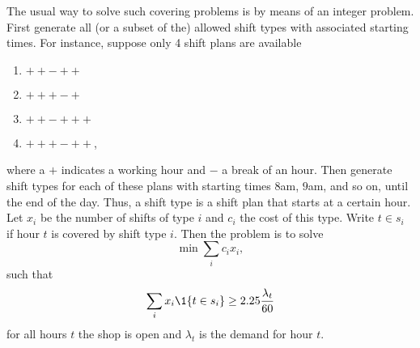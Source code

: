 The usual way to solve such covering problems is by means of an integer
problem. First generate all (or a subset of the) allowed shift types
with associated starting times. For instance, suppose only 4 shift
plans are available
\begin{enumerate}
\item $++-++$
\item $+++-+$
\item $++-+++$
\item $+++-++$,
\end{enumerate}
where a $+$ indicates a working hour and $-$ a break of an hour. Then
generate shift types for each of these plans with starting times
$8$am, $9$am, and so on, until the end of the day. Thus, a shift type
is a shift plan that starts at a certain hour. Let $x_i$ be the number
of shifts of type $i$ and $c_i$ the cost of this type. Write $t\in s_i$ if
hour $t$ is covered by shift type $i$. Then the problem is to solve
\begin{equation*}
 \min \sum_i c_i x_i,
\end{equation*}
such that 
\begin{equation*}
 \sum_i x_i \1{t \in s_i} \geq 2.25 \frac{\lambda_t}{60}
\end{equation*}
for all hours $t$ the shop is open and $\lambda_t$ is the demand for
hour $t$.








